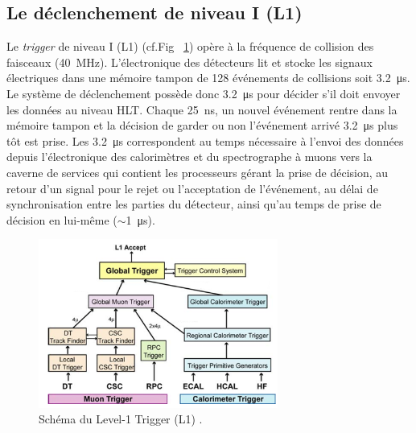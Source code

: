 \subsection{Le déclenchement de niveau I (L1)}
Le \textit{trigger} de niveau I (L1) (cf.Fig~ \ref{L1}) opère à la fréquence de collision des faisceaux (\SI{40}{\mega\hertz}). L'électronique des détecteurs lit et stocke les  signaux électriques dans une mémoire tampon de \num{128} événements de collisions soit \SI{3.2}{\micro\second}. Le système de déclenchement possède donc \SI{3.2}{\micro\second} pour  décider s'il doit envoyer les données au niveau HLT. Chaque \SI{25}{\nano\second}, un nouvel événement rentre dans la mémoire tampon et la décision de garder ou non l'événement arrivé \SI{3.2}{\micro\second} plus tôt est prise. Les \SI{3.2}{\micro\second} correspondent au temps nécessaire à l'envoi des données depuis l'électronique des calorimètres et du spectrographe à muons vers la caverne de services qui contient les processeurs gérant la prise de décision, au retour d'un signal pour le rejet ou l'acceptation de l'événement, au délai de synchronisation entre les parties du détecteur, ainsi qu'au temps de prise de décision en lui-même ($\sim$\SI{1}{\micro\second}). 

	  \begin{figure}[ht!]
	\centering
	\includegraphics[width=0.70\textwidth]{CMS/L1.png}
	\captionsetup{type=figure}\caption{Schéma du Level-1 Trigger (L1) \cite{1748-0221-3-08-S08004}.}
	\label{L1}
\end{figure}

